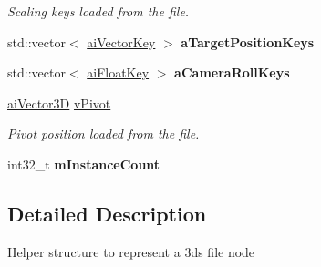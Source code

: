 \begin{DoxyCompactItemize}
\begin{DoxyCompactList}\small\item\em Scaling keys loaded from the file. \end{DoxyCompactList}\item 
\hypertarget{struct_assimp_1_1_d3_d_s_1_1_node_afff10924d00602db55e43f0301db283e}{std\+::vector$<$ \hyperlink{structai_vector_key}{ai\+Vector\+Key} $>$ {\bfseries a\+Target\+Position\+Keys}}\label{struct_assimp_1_1_d3_d_s_1_1_node_afff10924d00602db55e43f0301db283e}

\item 
\hypertarget{struct_assimp_1_1_d3_d_s_1_1_node_a28be1491e94aef440884564059aa8654}{std\+::vector$<$ \hyperlink{struct_assimp_1_1_d3_d_s_1_1ai_float_key}{ai\+Float\+Key} $>$ {\bfseries a\+Camera\+Roll\+Keys}}\label{struct_assimp_1_1_d3_d_s_1_1_node_a28be1491e94aef440884564059aa8654}

\item 
\hypertarget{struct_assimp_1_1_d3_d_s_1_1_node_a81688b6c002444f69544264250edab90}{\hyperlink{structai_vector3_d}{ai\+Vector3\+D} \hyperlink{struct_assimp_1_1_d3_d_s_1_1_node_a81688b6c002444f69544264250edab90}{v\+Pivot}}\label{struct_assimp_1_1_d3_d_s_1_1_node_a81688b6c002444f69544264250edab90}

\begin{DoxyCompactList}\small\item\em Pivot position loaded from the file. \end{DoxyCompactList}\item 
\hypertarget{struct_assimp_1_1_d3_d_s_1_1_node_a81b6c782ed35510638d527a5de64f6d3}{int32\+\_\+t {\bfseries m\+Instance\+Count}}\label{struct_assimp_1_1_d3_d_s_1_1_node_a81b6c782ed35510638d527a5de64f6d3}

\end{DoxyCompactItemize}


\subsection{Detailed Description}
Helper structure to represent a 3ds file node 

